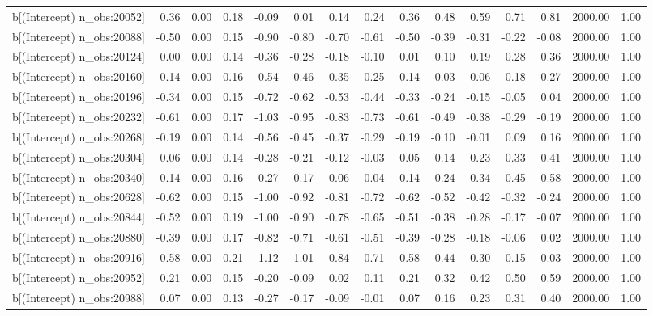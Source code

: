 \begin{table}[ht]
\begin{tabular}{rrrrrrrrrrrrrrr}
  b[(Intercept) n\_obs:20052] & 0.36 & 0.00 & 0.18 & -0.09 & 0.01 & 0.14 & 0.24 & 0.36 & 0.48 & 0.59 & 0.71 & 0.81 & 2000.00 & 1.00 \\ 
  b[(Intercept) n\_obs:20088] & -0.50 & 0.00 & 0.15 & -0.90 & -0.80 & -0.70 & -0.61 & -0.50 & -0.39 & -0.31 & -0.22 & -0.08 & 2000.00 & 1.00 \\ 
  b[(Intercept) n\_obs:20124] & 0.00 & 0.00 & 0.14 & -0.36 & -0.28 & -0.18 & -0.10 & 0.01 & 0.10 & 0.19 & 0.28 & 0.36 & 2000.00 & 1.00 \\ 
  b[(Intercept) n\_obs:20160] & -0.14 & 0.00 & 0.16 & -0.54 & -0.46 & -0.35 & -0.25 & -0.14 & -0.03 & 0.06 & 0.18 & 0.27 & 2000.00 & 1.00 \\ 
  b[(Intercept) n\_obs:20196] & -0.34 & 0.00 & 0.15 & -0.72 & -0.62 & -0.53 & -0.44 & -0.33 & -0.24 & -0.15 & -0.05 & 0.04 & 2000.00 & 1.00 \\ 
  b[(Intercept) n\_obs:20232] & -0.61 & 0.00 & 0.17 & -1.03 & -0.95 & -0.83 & -0.73 & -0.61 & -0.49 & -0.38 & -0.29 & -0.19 & 2000.00 & 1.00 \\ 
  b[(Intercept) n\_obs:20268] & -0.19 & 0.00 & 0.14 & -0.56 & -0.45 & -0.37 & -0.29 & -0.19 & -0.10 & -0.01 & 0.09 & 0.16 & 2000.00 & 1.00 \\ 
  b[(Intercept) n\_obs:20304] & 0.06 & 0.00 & 0.14 & -0.28 & -0.21 & -0.12 & -0.03 & 0.05 & 0.14 & 0.23 & 0.33 & 0.41 & 2000.00 & 1.00 \\ 
  b[(Intercept) n\_obs:20340] & 0.14 & 0.00 & 0.16 & -0.27 & -0.17 & -0.06 & 0.04 & 0.14 & 0.24 & 0.34 & 0.45 & 0.58 & 2000.00 & 1.00 \\ 
  b[(Intercept) n\_obs:20628] & -0.62 & 0.00 & 0.15 & -1.00 & -0.92 & -0.81 & -0.72 & -0.62 & -0.52 & -0.42 & -0.32 & -0.24 & 2000.00 & 1.00 \\ 
  b[(Intercept) n\_obs:20844] & -0.52 & 0.00 & 0.19 & -1.00 & -0.90 & -0.78 & -0.65 & -0.51 & -0.38 & -0.28 & -0.17 & -0.07 & 2000.00 & 1.00 \\ 
  b[(Intercept) n\_obs:20880] & -0.39 & 0.00 & 0.17 & -0.82 & -0.71 & -0.61 & -0.51 & -0.39 & -0.28 & -0.18 & -0.06 & 0.02 & 2000.00 & 1.00 \\ 
  b[(Intercept) n\_obs:20916] & -0.58 & 0.00 & 0.21 & -1.12 & -1.01 & -0.84 & -0.71 & -0.58 & -0.44 & -0.30 & -0.15 & -0.03 & 2000.00 & 1.00 \\ 
  b[(Intercept) n\_obs:20952] & 0.21 & 0.00 & 0.15 & -0.20 & -0.09 & 0.02 & 0.11 & 0.21 & 0.32 & 0.42 & 0.50 & 0.59 & 2000.00 & 1.00 \\ 
  b[(Intercept) n\_obs:20988] & 0.07 & 0.00 & 0.13 & -0.27 & -0.17 & -0.09 & -0.01 & 0.07 & 0.16 & 0.23 & 0.31 & 0.40 & 2000.00 & 1.00 \\ 

\end{tabular}
\end{table}
